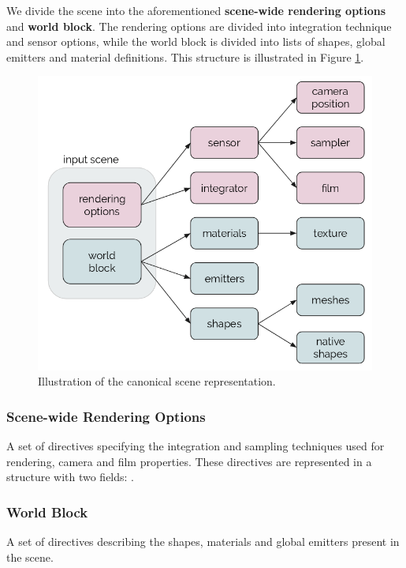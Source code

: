 

We divide the scene into the aforementioned \textbf{scene-wide rendering options} and \textbf{world
block}. The rendering options are divided into integration technique and sensor
options, while the world block is divided into lists of shapes, global emitters
and material definitions. This structure is illustrated in Figure
\ref{fig:canonicalrep}.

\begin{figure}[h]
\centering
\includegraphics[width=0.6\linewidth]{figs/3_system_architecture/canonicalrep.png}
\caption{Illustration of the canonical scene representation.}
\label{fig:canonicalrep}
\end{figure}

\subsubsection{Scene-wide Rendering Options}
A set of directives specifying the integration and sampling techniques used for
rendering, camera and film properties. These directives are represented in a
structure with two fields: .

\subsubsection{World Block}
A set of directives describing the shapes, materials and global emitters present
in the scene.

